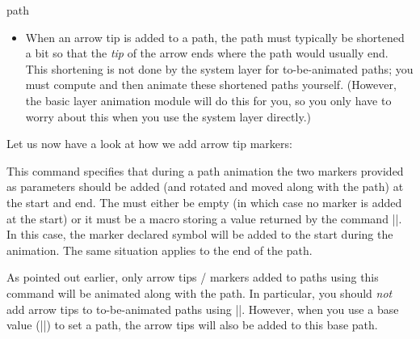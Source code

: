 \begin{sysanimateattribute}{path}
\begin{itemize}
            Thus, it is best to add arrow tips only to ``normal'' paths
            consisting of a single open path segment whose ends can be
            shortened a bit without causing degeneration.
        \item When an arrow tip is added to a path, the path must typically be
            shortened a bit so that the \emph{tip} of the arrow ends where the
            path would usually end. This shortening is not done by the system
            layer for to-be-animated paths; you must compute and then animate
            these shortened paths yourself. (However, the basic layer animation
            module will do this for you, so you only have to worry about this
            when you use the system layer directly.)
    \end{itemize}

    Let us now have a look at how we add arrow tip markers:
    \begin{command}{\pgfsysanimkeytipmarkers{}}
    \end{command}
    \begin{command}{\pgfsys@animation@tip@markers{}}
        This command specifies that during a path animation the two markers
        provided as parameters should be added (and rotated and moved along
        with the path) at the start and end. The  must
        either be empty (in which case no marker is added at the start) or it
        must be a macro storing a value returned by the command
        |\pgfsys@marker@declare|. In this case, the marker declared symbol will
        be added to the start during the animation. The same situation applies
        to the end of the path.

        As pointed out earlier, only arrow tips / markers added to paths using
        this command will be animated along with the path. In particular, you
        should \emph{not} add arrow tips to to-be-animated paths using
        |\pgfsetarrow|. However, when you use a base value
        (|\pgfsys@animation@base|) to set a path, the arrow tips will also be
        added to this base path.


\end{command}
\end{sysanimateattribute}

